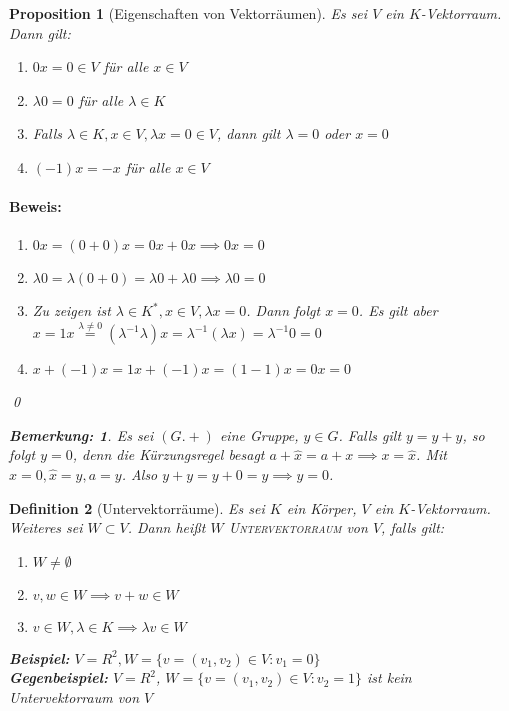 \documentclass{report}
\newcommand{\IN}[1]{\index{#1|BH}}
\newcommand{\lb}{\lambda}
\theoremstyle{customrem}
\newtheorem*{bemerkung}{Bemerkung\textnormal:}
\theoremstyle{customdef}
\newtheorem{definition}{Definition}[chapter]
\newtheorem{proposition}[definition]{Proposition}
\renewenvironment{proof}{\paragraph{Beweis: }}{\qed}
\theoremstyle{customenv}
\newcommand{\defemph}[1]{\textsc{#1}}
\begin{document}
	\begin{proposition}[Eigenschaften von Vektorräumen]
		Es sei \(V\) ein \(K\)-Vektorraum. Dann gilt:
		\begin{enumerate}[leftmargin=4cm]
			\itemsep0cm
			\item \(0 x = 0 \in V\) für alle \(x \in V\)
			\item \(\lb 0 = 0\) für alle \(\lb \in K\)
			\item Falls \(\lb \in K, x \in V, \lb x = 0 \in V\), dann gilt \(\lb = 0\) oder \(x = 0\)
			\item \((-1) x = -x\) für alle \(x \in V\)
		\end{enumerate}
		\begin{proof}
			\begin{enumerate}
				\itemsep0cm
				\item \(0 x = (0 + 0)x = 0x + 0x \implies 0x = 0\)
				\item \(\lb 0 = \lb(0 + 0) = \lb 0 + \lb 0 \implies \lb 0 = 0\)
				\item Zu zeigen ist \(\lb \in K^\ast, x \in V, \lb x = 0\). Dann folgt \(x = 0\). Es gilt aber \(x = 1 x \overset{\lb \neq 0}{=} (\lb ^{-1} \lb) x = \lb^{-1}(\lb x) = \lb^{-1} 0 = 0\)
				\item \(x + (-1) x = 1x + (-1) x = (1 - 1)  x = 0 x = 0\)
			\end{enumerate}
		\end{proof}
		\begin{bemerkung}
			Es sei \((G. +)\) eine Gruppe, \(y \in G\). Falls gilt \(y = y + y\), so folgt \(y = 0\), denn die Kürzungsregel besagt \(a + \hat{x} = a+x \implies x = \hat{x}\). Mit \(x = 0, \hat{x} = y, a = y\). Also \(y +y = y + 0 = y \implies y = 0\).
		\end{bemerkung}
	\end{proposition}

	\begin{definition}[Untervektorräume]
		\IN{Untervektorraum}
		Es sei \(K\) ein Körper, \(V\) ein \(K\)-Vektorraum. Weiteres sei \(W \subset V\). Dann heißt \(W\) \defemph{Untervektorraum} von \(V\), falls gilt:

		\begin{enumerate}[leftmargin=4cm]
			\itemsep0cm
			\item \(W \neq \emptyset\)
			\item \(v, w \in W \implies v + w \in W\)
			\item \(v \in W, \lb \in K \implies \lb v \in W\)
		\end{enumerate}

		\textbf{Beispiel:}
		\(V = R^2, W = \{v = (v_1, v_2) \in V : v_1 = 0\}\)\\
		\textbf{Gegenbeispiel:}
		\(V = R^2\), \(W = \{v = (v_1, v_2) \in V : v_2 = 1\}\) ist kein Untervektorraum von \(V\)
	\end{definition}
\end{document}
